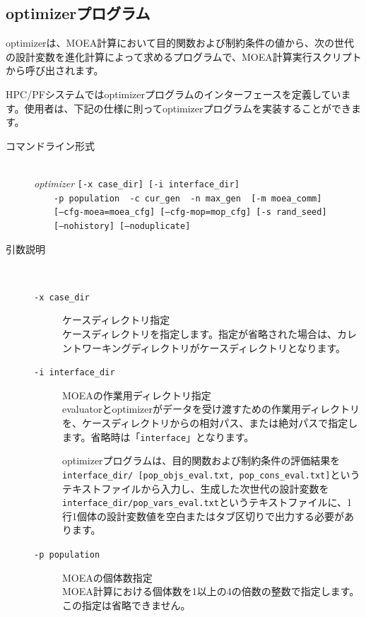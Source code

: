 \documentclass[a4paper,11pt]{jarticle}
\begin{document}
{\newpage
\subsection{optimizerプログラム}

optimizerは、MOEA計算において目的関数および制約条件の値から、次の世代の設計変数を進化計算によって求めるプログラムで、MOEA計算実行スクリプトから呼び出されます。

HPC/PFシステムではoptimizerプログラムのインターフェースを定義しています。使用者は、下記の仕様に則ってoptimizerプログラムを実装することができます。

\begin{description}
\item[コマンドライン形式] {\ }\\
\textit{optimizer} {\tt [-x case\_dir] [-i interface\_dir]}\\
\ \ \ \ {\tt -p population \ -c cur\_gen \ -n max\_gen \ [-m moea\_comm]}\\
\ \ \ \ {\tt [--cfg-moea=moea\_cfg] [--cfg-mop=mop\_cfg] [-s rand\_seed]}\\
\ \ \ \ {\tt [--nohistory] [--noduplicate]}


\item[引数説明] {\ }\par
\begin{description}
\item[{\tt -x  case\_dir}] ケースディレクトリ指定\\
ケースディレクトリを指定します。指定が省略された場合は、カレントワーキングディレクトリがケースディレクトリとなります。\\

\item[{\tt -i  interface\_dir}] MOEAの作業用ディレクトリ指定\\
evaluatorとoptimizerがデータを受け渡すための作業用ディレクトリを、ケースディレクトリからの相対パス、または絶対パスで指定します。省略時は「{\tt interface}」となります。

optimizerプログラムは、目的関数および制約条件の評価結果を{\tt interface\_dir/ [pop\_objs\_eval.txt, pop\_cons\_eval.txt]}というテキストファイルから入力し、生成した次世代の設計変数を{\tt interface\_dir/pop\_vars\_eval.txt}というテキストファイルに、1行1個体の設計変数値を空白またはタブ区切りで出力する必要があります。\\

\item[{\tt -p  population}] MOEAの個体数指定\\
MOEA計算における個体数を1以上の4の倍数の整数で指定します。この指定は省略できません。\\


\end{description}
\end{description}}
\end{document}
